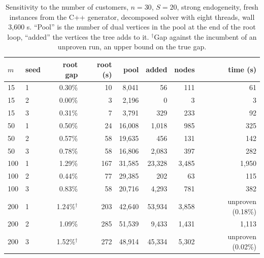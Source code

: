 \documentclass[11pt]{article}
\begin{document}
\begin{table}[ht]
\centering\small
\caption{Sensitivity to the number of customers, $n = 30$, $S = 20$, strong endogeneity, fresh instances from the
C++ generator, decomposed solver with eight threads, wall 3,600 s. ``Pool'' is the number of dual vertices in the pool
at the end of the root loop, ``added'' the vertices the tree adds to it. $^\dagger$Gap against the incumbent of an
unproven run, an upper bound on the true gap.}
\label{tab:msens}
\begin{tabular}{ll rrrr rr}
\toprule
$m$ & seed & root gap & root (s) & pool & added & nodes & time (s)\\
\midrule
15 & 1 & 0.30\% & 10 & 8,041 & 56 & 111 & 61\\
15 & 2 & 0.00\% & 3 & 2,196 & 0 & 3 & 3\\
15 & 3 & 0.31\% & 7 & 3,791 & 329 & 233 & 92\\
50 & 1 & 0.50\% & 24 & 16,008 & 1,018 & 985 & 325\\
50 & 2 & 0.57\% & 58 & 19,635 & 456 & 131 & 142\\
50 & 3 & 0.78\% & 58 & 16,806 & 2,083 & 397 & 282\\
100 & 1 & 1.29\% & 167 & 31,585 & 23,328 & 3,485 & 1,950\\
100 & 2 & 0.44\% & 77 & 29,385 & 202 & 63 & 115\\
100 & 3 & 0.83\% & 58 & 20,716 & 4,293 & 781 & 382\\
200 & 1 & 1.24\%$^\dagger$ & 203 & 42,640 & 53,934 & 3,858 & unproven (0.18\%)\\
200 & 2 & 1.09\% & 285 & 51,539 & 9,433 & 1,431 & 1,113\\
200 & 3 & 1.52\%$^\dagger$ & 272 & 48,914 & 45,334 & 5,302 & unproven (0.02\%)\\
\bottomrule
\end{tabular}
\end{table}
\end{document}
